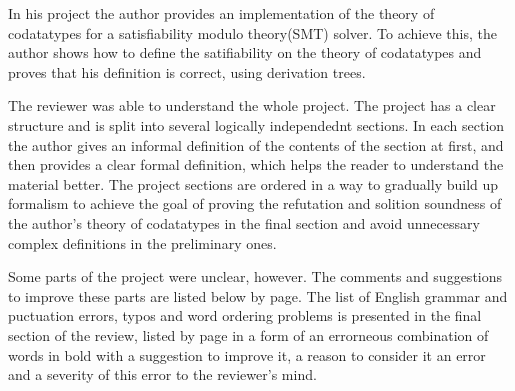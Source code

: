 

\maketitle


In his project the author provides an implementation of the theory of codatatypes for a satisfiability modulo theory(SMT) solver. To achieve this, the author shows how to define the satifiability on the theory of codatatypes and proves that his definition is correct, using derivation trees.


The reviewer was able to understand the whole project. The project has a clear structure and is split into several logically independednt sections. In each section the author gives an informal definition of the contents of the section at first, and then provides a clear formal definition, which helps the reader to understand the material better. The project sections are ordered in a way to gradually build up formalism to achieve the goal of proving the refutation and solition soundness of the author's theory of codatatypes in the final section and avoid unnecessary complex definitions in the preliminary ones.


Some parts of the project were unclear, however. The comments and suggestions to improve these parts are listed below by page. The list of English grammar and puctuation errors, typos and word ordering problems is presented in the final section of the review, listed by page in a form of an errorneous combination of words in bold with a suggestion to improve it, a reason to consider it an error and a severity of this error to the reviewer's mind.


